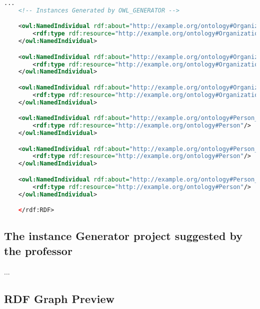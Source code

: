   \begin{lstlisting}[language=XML, caption={Results of RDF/XML generated instances}, basicstyle=\ttfamily\footnotesize, frame=single]
    ...
    <!-- Instances Generated by OWL_GENERATOR -->

    <owl:NamedIndividual rdf:about="http://example.org/ontology#Organization_instance0">
        <rdf:type rdf:resource="http://example.org/ontology#Organization"/>
    </owl:NamedIndividual>

    <owl:NamedIndividual rdf:about="http://example.org/ontology#Organization_instance1">
        <rdf:type rdf:resource="http://example.org/ontology#Organization"/>
    </owl:NamedIndividual>

    <owl:NamedIndividual rdf:about="http://example.org/ontology#Organization_instance2">
        <rdf:type rdf:resource="http://example.org/ontology#Organization"/>
    </owl:NamedIndividual>

    <owl:NamedIndividual rdf:about="http://example.org/ontology#Person_instance0">
        <rdf:type rdf:resource="http://example.org/ontology#Person"/>
    </owl:NamedIndividual>

    <owl:NamedIndividual rdf:about="http://example.org/ontology#Person_instance1">
        <rdf:type rdf:resource="http://example.org/ontology#Person"/>
    </owl:NamedIndividual>

    <owl:NamedIndividual rdf:about="http://example.org/ontology#Person_instance2">
        <rdf:type rdf:resource="http://example.org/ontology#Person"/>
    </owl:NamedIndividual>

    </rdf:RDF>
\end{lstlisting}

\subsection{The instance Generator project suggested by the professor}
...

\subsection{RDF Graph Preview}

